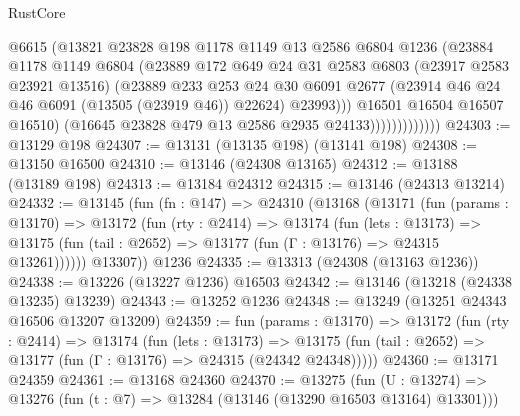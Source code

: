\begin{lexlean}{RustCore}
\begin{coremodule}
                            @6615
                            (@13821
                              @23828
                              @198
                              @1178
                              @1149
                              @13
                              @2586
                              @6804
                              @1236
                              (@23884
                                @1178
                                @1149
                                @6804
                                (@23889
                                  @172
                                  @649
                                  @24
                                  @31
                                  @2583
                                  @6803
                                  (@23917 @2583 @23921 @13516)
                                  (@23889
                                    @233
                                    @253
                                    @24
                                    @30
                                    @6091
                                    @2677
                                    (@23914 @46 @24 @46 @6091 (@13505 (@23919 @46)) @22624)
                                    @23993)))
                              @16501
                              @16504
                              @16507
                              @16510)
                            (@16645 @23828 @479 @13 @2586 @2935 @24133)))))))))))))
@24303 := @13129 @198
@24307 := @13131 (@13135 @198) (@13141 @198)
@24308 := @13150 @16500
@24310 := @13146 (@24308 @13165)
@24312 := @13188 (@13189 @198)
@24313 := @13184 @24312
@24315 := @13146 (@24313 @13214)
@24332 := @13145
    (fun (fn : @147) =>
    @24310
      (@13168
        (@13171
          (fun (params : @13170) =>
          @13172
            (fun (rty : @2414) =>
            @13174
              (fun (lets : @13173) =>
              @13175 (fun (tail : @2652) => @13177 (fun (Γ : @13176) => @24315 @13261))))))
        @13307))
    @1236
@24335 := @13313 (@24308 (@13163 @1236))
@24338 := @13226 (@13227 @1236) @16503
@24342 := @13146 (@13218 (@24338 @13235) @13239)
@24343 := @13252 @1236
@24348 := @13249 (@13251 @24343 @16506 @13207 @13209)
@24359 := fun (params : @13170) =>
  @13172
    (fun (rty : @2414) =>
    @13174
      (fun (lets : @13173) =>
      @13175 (fun (tail : @2652) => @13177 (fun (Γ : @13176) => @24315 (@24342 @24348)))))
@24360 := @13171 @24359
@24361 := @13168 @24360
@24370 := @13275
    (fun (U : @13274) => @13276 (fun (t : @7) => @13284 (@13146 (@13290 @16503 @13164) @13301)))

\end{coremodule}
\end{lexlean}
